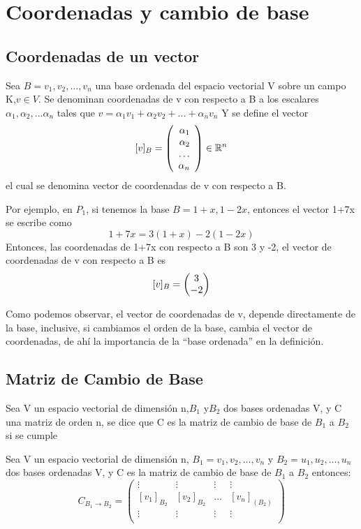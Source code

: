 
\chapter{Coordenadas y cambio de base}
\section{Coordenadas de un vector}
\begin{dfn} 

Sea $B={v_1,v_2,...,v_n}$ una base ordenada del espacio vectorial V sobre un campo K,$v\in V$. Se denominan coordenadas de v con respecto a B a los escalares $\alpha _1,\alpha _2,...\alpha _n$ tales que
$v=\alpha _1 v_1+\alpha _2 v_2+ ...+\alpha _n v_n$
Y se define el vector $$[v]_B=\vectr4{\alpha _1}{\alpha _2}{\ldots}{\alpha _n} \in  \rn$$ el cual se denomina vector de coordenadas de v con respecto a B. 
\end{dfn}

Por ejemplo, en $P_1$, si tenemos la base $B={1+x,1-2x}$, entonces el vector 1+7x se escribe como
$$1+7x=3(1+x)-2(1-2x)$$
Entonces, las coordenadas de 1+7x con respecto a B son 3 y -2, el vector de coordenadas de v con respecto a B es $$[v]_B=\begin{pmatrix} 3\\ -2\\ \end{pmatrix} $$

Como podemos observar, el vector de coordenadas de v, depende directamente de la base, inclusive, si cambiamos el orden de la base, cambia el vector de coordenadas, de ahí la importancia de la “base ordenada” en la definición.

\section{Matriz de Cambio de Base}
\begin{dfn} Sea V un espacio vectorial de dimensión n,$ B_1$  y$ B_2$  dos bases ordenadas V, y C una matriz de orden n, se dice que C es la matriz de cambio de base de $B_1$ a $B_2$ si se cumple
\end{dfn}

\begin{theorem}


Sea V un espacio vectorial de dimensión n, $B_1={v_1,v_2,…,v_n }$  y $B_2={u_1,u_2,…,u_n}$  dos bases ordenadas V, y C es la matriz de cambio de base de $B_1$ a $B_2$ entonces:
\[C_{B_1 \rightarrow B_2}= \left(\begin{array}{cccc}
\vdots & \vdots & \vdots & \vdots\\
\left[v_1\right]_{B_2}&\left[v_2\right]_{B_2}& ... & \left[v_n\right]_{(B_2 )}\\
\vdots & \vdots & \vdots & \vdots\\
\end{array}
\right)\]
\end{theorem}

